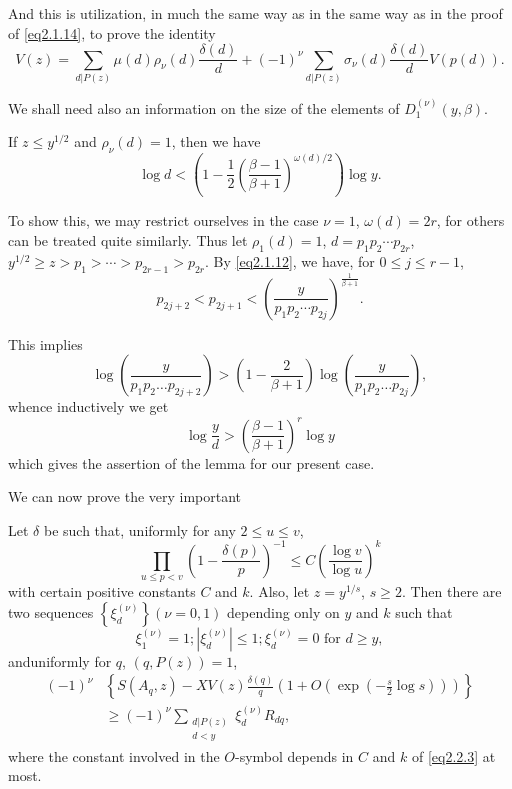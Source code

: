 And this is utilization, in much the same way as in the same way as in
the proof of \eqref{eq2.1.14}, to prove the identity 
 \begin{equation*}
   V(z)= \sum_{d|P(z)} \mu(d)\rho_\nu(d) \frac{\delta(d)}{d}+ (-1)^\nu
   \sum_{d|P(z)} \sigma_\nu(d) \frac{\delta(d)}{d}
   V(p(d)). \tag{2.2.2} \label{eq2.2.2} 
 \end{equation*}  
  
 We shall need also an information on the size of the elements of
 $D^{(\nu)}_1(y, \beta)$. 

\begin{Lemma}\label{chap2-lem9}%
If $z \le y^{1/2}$ and $\rho_\nu(d) =1$, then we have 
$$
\log d< \left(1- \frac{1}{2}
\left(\frac{\beta-1}{\beta+1}\right)^{\omega(d)/2}\right)  \log y.
$$
\end{Lemma}\pageoriginale

To show this, we may restrict ourselves in the case $\nu=1$,
 $\omega(d)=2r$, for others can be treated quite similarly. Thus let
$\rho_1(d)=1$, $d= p_1p_2 \cdots p_{2r}$, $y^{1/2} \ge z > p_1 > \cdots >
p_{2r-1} > p_{2r}$. By \eqref{eq2.1.12}, we have, for $0 \le j \le r-1$, 
$$
p_{2 j+2} < p_{2j+1} < \left(\frac{y}{p_1p_2 \cdots
  p_{2j}}\right)^{\frac{1}{\beta+1}}. 
$$

This implies 
$$
\log \left( \frac{y}{p_1p_2 \ldots p_{2j+2}}\right) >
\left(1-\frac{2}{\beta+1}\right) \log \left(
\frac{y}{p_1p_2 \ldots p_{2j}}\right), 
$$
whence inductively we get
$$
\log \frac{y}{d} > \left(\frac{\beta-1}{\beta+1}\right)^r \log y
$$
which gives the assertion of the lemma for our present case. 

We can now prove the very important

\begin{theorem}\label{chap2-thm7}
 Let $\delta$ be such that, uniformly for
  any $2 \le u \le v$, 
  \begin{equation*}
    \prod_{u \le p < v} \left(1- \frac{\delta(p)}{p}\right)^{-1} \le C
    \left(\frac{\log v}{\log u}\right)^k \tag{2.2.3} \label{eq2.2.3}
  \end{equation*}
  with certain positive constants  $C$ and $k$. Also, let $z=
  y^{1/s}$, $s \ge 2$. Then there are two sequences
  $\left\{\xi^{(\nu)}_d\right\}(\nu  = 0,1)$ depending only on $y$ and $k$ such
  that  
  \begin{equation*}
    \xi^{(\nu)}_1 =1;  |\xi^{(\nu)}_d| \le 1; \xi^{(\nu)}_d= 0 \text{ for
    } d \ge y, \tag{i} 
  \end{equation*}
  and\pageoriginale uniformly for $q$,  $(q, P(z)) =1$, 
  \begin{align*}
    (-1)^\nu  &\left\{S(A_q,z) -XV(z) \frac{\delta(q)}{q} \left(1+ O
    \left(\exp\left(-\frac{s}{2} \log s\right)\right)\right)\right\}\\
    &\ge (-1)^\nu \sum_{\substack{d|P(z)\\d < y}} \xi^{(\nu)}_d R_{dq}, \tag{ii} 
  \end{align*}
  where the constant involved  in the $O$-symbol depends in $C$ and
  $k$ of \eqref{eq2.2.3} at most. 
\end{theorem}

